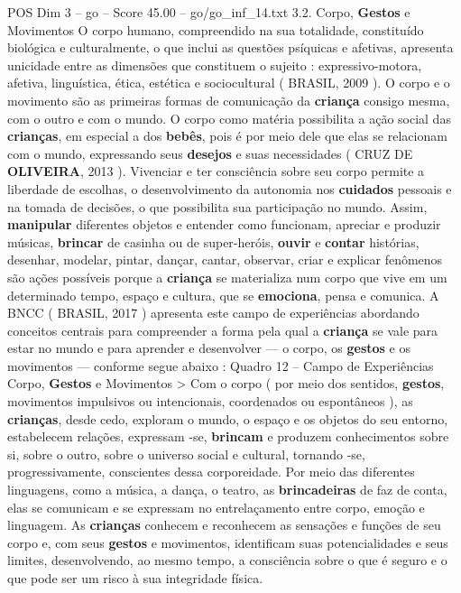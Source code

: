 \begin{textsample}{POS Dim 3 – go – Score 45.00 – go/go\_inf\_14.txt}  \label{ex:f3_pos_043}
3.2.
Corpo, \textbf{Gestos} e Movimentos O corpo humano, compreendido na sua totalidade, constituído biológica e culturalmente, o que inclui as questões psíquicas e afetivas, apresenta unicidade entre as dimensões que constituem o sujeito : expressivo-motora, afetiva, linguística, ética, estética e sociocultural ( BRASIL, 2009 ).
O corpo e o movimento são as primeiras formas de comunicação da \textbf{criança} consigo mesma, com o outro e com o mundo.
O corpo como matéria possibilita a ação social das \textbf{crianças}, em especial a dos \textbf{bebês}, pois é por meio dele que elas se relacionam com o mundo, expressando seus \textbf{desejos} e suas necessidades ( CRUZ DE \textbf{OLIVEIRA}, 2013 ).
Vivenciar e ter consciência sobre seu corpo permite a liberdade de escolhas, o desenvolvimento da autonomia nos \textbf{cuidados} pessoais e na tomada de decisões, o que possibilita sua participação no mundo.
Assim, \textbf{manipular} diferentes objetos e entender como funcionam, apreciar e produzir músicas, \textbf{brincar} de casinha ou de super-heróis, \textbf{ouvir} e \textbf{contar} histórias, desenhar, modelar, pintar, dançar, cantar, observar, criar e explicar fenômenos são ações possíveis porque a \textbf{criança} se materializa num corpo que vive em um determinado tempo, espaço e cultura, que se \textbf{emociona}, pensa e comunica.
A BNCC ( BRASIL, 2017 ) apresenta este campo de experiências abordando conceitos centrais para compreender a forma pela qual a \textbf{criança} se vale para estar no mundo e para aprender e desenvolver — o corpo, os \textbf{gestos} e os movimentos — conforme segue abaixo : Quadro 12 – Campo de Experiências Corpo, \textbf{Gestos} e Movimentos > Com o corpo ( por meio dos sentidos, \textbf{gestos}, movimentos impulsivos ou intencionais, coordenados ou espontâneos ), as \textbf{crianças}, desde cedo, exploram o mundo, o espaço e os objetos do seu entorno, estabelecem relações, expressam -se, \textbf{brincam} e produzem conhecimentos sobre si, sobre o outro, sobre o universo social e cultural, tornando -se, progressivamente, conscientes dessa corporeidade.
Por meio das diferentes linguagens, como a música, a dança, o teatro, as \textbf{brincadeiras} de faz de conta, elas se comunicam e se expressam no entrelaçamento entre corpo, emoção e linguagem.
As \textbf{crianças} conhecem e reconhecem as sensações e funções de seu corpo e, com seus \textbf{gestos} e movimentos, identificam suas potencialidades e seus limites, desenvolvendo, ao mesmo tempo, a consciência sobre o que é seguro e o que pode ser um risco à sua integridade física.

\end{textsample}
